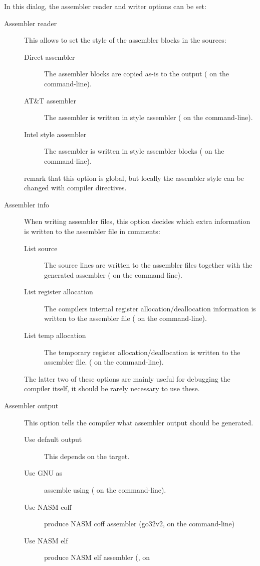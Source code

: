 In this dialog, the assembler reader and writer options can be set:
\begin{description}
\item[Assembler reader] This allows to set the style of the assembler blocks
in the sources:
\begin{description}
\item[Direct assembler] The assembler blocks are copied as-is to the output
( on the command-line).
\item[AT\&T assembler] The assembler is written in  style
assembler ( on the command-line).
\item[Intel style assembler] The assembler is written in  style
assembler blocks ( on the command-line).
\end{description}
remark that this option is global, but locally the assembler style can be
changed with compiler directives.
\item[Assembler info] When writing assembler files, this option decides
which extra information is written to the assembler file in comments:
\begin{description}
\item[List source] The source lines are written to the assembler files
together with the generated assembler ( on the command line).
\item[List register allocation] The compilers internal register
allocation/deallocation information is written to the assembler file
( on the command-line).
\item[List temp allocation] The temporary register allocation/deallocation
is written to the assembler file. ( on the command-line).
\end{description}
The latter two of these options are mainly useful for debugging the
compiler itself, it should be rarely necessary to use these.
\item[Assembler output] This option tells the compiler what assembler output
should be generated.
\begin{description}
\item[Use default output] This depends on the target.
\item[Use GNU as] assemble using \gnu {} ( on the
command-line).
\item[Use NASM coff] produce NASM coff assembler (go32v2,  on the
command-line)
\item[Use NASM elf] produce NASM elf assembler (\linux,  on

\end{description}
\end{description}
